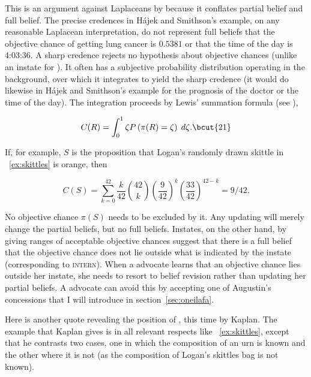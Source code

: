 \documentclass[phd,12pt,oneside]{ubcthesis}
\begin{document}
This is an argument against Laplaceans by {\anderson} because it
conflates partial belief and full belief. The precise credences in
H{\'a}jek and Smithson's example, on any reasonable Laplacean
interpretation, do not represent full beliefs that the objective
chance of getting lung cancer is $0.5381$ or that the time of the day
is 4:03:36. A sharp credence rejects no hypothesis about objective
chances (unlike an instate for {\anderson}). It often has a subjective
probability distribution operating in the background, over which it
integrates to yield the sharp credence (it would do likewise in
H{\'a}jek and Smithson's example for the prognosis of the doctor or
the time of the day). The integration proceeds by Lewis'
summation formula (see ),

\begin{equation}
  \label{eq:s2}
  C(R)=\int_{0}^{1}\zeta{}P\left(\pi(R)=\zeta\right)\;{}d\zeta{}.\bcut{21}
\end{equation}

{\noindent}If, for example, $S$ is the proposition that Logan's
randomly drawn skittle in {\xample}~\ref{ex:skittles} is orange, then

\begin{equation}
  \label{eq:skit}
  C(S)=\sum_{k=0}^{42}\frac{k}{42}\binom{42}{k}\left(\frac{9}{42}\right)^{k}\left(\frac{33}{42}\right)^{42-k}=9/42.
\end{equation}

No objective chance $\pi(S)$ needs to be excluded by it. Any updating
will merely change the partial beliefs, but no full beliefs. Instates,
on the other hand, by giving ranges of acceptable objective chances
suggest that there is a full belief that the objective chance does not
lie outside what is indicated by the instate (corresponding to
\textsc{intern}). When a {\anderson} advocate learns that an objective
chance lies outside her instate, she needs to resort to belief
revision rather than updating her partial beliefs. A {\augustin}
advocate can avoid this by accepting one of Augustin's concessions
that I will introduce in section~\ref{sec:oneilafa}.

Here is another quote revealing the position of {\anderson}, this
time by Kaplan. The example that Kaplan gives is in all relevant
respects like {\xample}~\ref{ex:skittles}, except that he contrasts two
cases, one in which the composition of an urn is known and the other
where it is not (as the composition of Logan's skittles bag is not
known).
\end{document}
